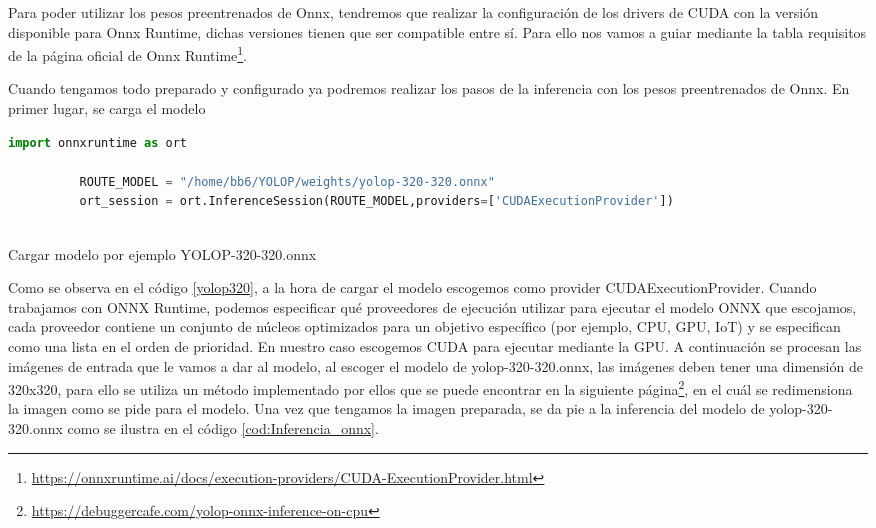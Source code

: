       Para poder utilizar los pesos preentrenados de Onnx, tendremos que realizar la configuración de los drivers de CUDA con la versión disponible para Onnx Runtime, 
      dichas versiones tienen que ser compatible entre sí. Para ello nos vamos a guiar mediante la tabla requisitos de la página oficial de Onnx Runtime\footnote{\url{https://onnxruntime.ai/docs/execution-providers/CUDA-ExecutionProvider.html}}. \newline

      Cuando tengamos todo preparado y configurado ya podremos realizar los pasos de la inferencia con los pesos preentrenados de Onnx. En primer lugar, se carga el modelo
      
      \begin{code}[h]
        \begin{lstlisting}[language=Python]
          import onnxruntime as ort

          ROUTE_MODEL = "/home/bb6/YOLOP/weights/yolop-320-320.onnx"
          ort_session = ort.InferenceSession(ROUTE_MODEL,providers=['CUDAExecutionProvider'])
      
        \end{lstlisting}
        \caption[Cargar modelo]{Cargar modelo por ejemplo YOLOP-320-320.onnx}
        \label{yolop320}
        \end{code}  

        Como se observa en el código \ref{yolop320}, a la hora de cargar el modelo escogemos como provider CUDAExecutionProvider. Cuando trabajamos con ONNX Runtime, 
        podemos especificar qué proveedores de ejecución utilizar para ejecutar el modelo ONNX que escojamos, cada proveedor contiene un conjunto de núcleos optimizados para un objetivo específico (por ejemplo, CPU, GPU, IoT) y 
        se especifican como una lista en el orden de prioridad. En nuestro caso escogemos CUDA para ejecutar mediante la GPU. 
        \newline
        A continuación se procesan las imágenes de entrada que le vamos a dar al modelo, al escoger el modelo de yolop-320-320.onnx, las imágenes deben tener una dimensión de 320x320, para ello
        se utiliza un método implementado por ellos que se puede encontrar en la siguiente página\footnote{\url{https://debuggercafe.com/yolop-onnx-inference-on-cpu}}, en el cuál se redimensiona la imagen como se pide para el modelo. 
        Una vez que tengamos la imagen preparada, se da pie a la inferencia del modelo de yolop-320-320.onnx como se ilustra en el código \ref{cod:Inferencia_onnx}. \newline
      
